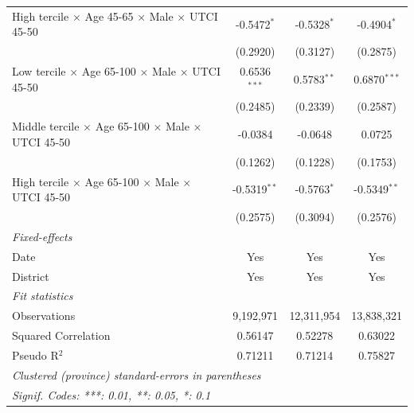 \begin{table}[htbp]
\begin{tabular}{lccc}
      High tercile $\times$ Age 45-65 $\times$ Male $\times$ UTCI 45-50         & -0.5472$^{*}$   & -0.5328$^{*}$     & -0.4904$^{*}$\\   
                                                                                & (0.2920)        & (0.3127)          & (0.2875)\\   
      Low tercile $\times$ Age 65-100 $\times$ Male $\times$ UTCI 45-50         & 0.6536$^{***}$  & 0.5783$^{**}$     & 0.6870$^{***}$\\   
                                                                                & (0.2485)        & (0.2339)          & (0.2587)\\   
      Middle tercile $\times$ Age 65-100 $\times$ Male $\times$ UTCI 45-50      & -0.0384         & -0.0648           & 0.0725\\   
                                                                                & (0.1262)        & (0.1228)          & (0.1753)\\   
      High tercile $\times$ Age 65-100 $\times$ Male $\times$ UTCI 45-50        & -0.5319$^{**}$  & -0.5763$^{*}$     & -0.5349$^{**}$\\   
                                                                                & (0.2575)        & (0.3094)          & (0.2576)\\   
      \midrule
      \emph{Fixed-effects}\\
      Date                                                                      & Yes             & Yes               & Yes\\  
      District                                                                  & Yes             & Yes               & Yes\\  
      \midrule
      \emph{Fit statistics}\\
      Observations                                                              & 9,192,971       & 12,311,954        & 13,838,321\\  
      Squared Correlation                                                       & 0.56147         & 0.52278           & 0.63022\\  
      Pseudo R$^2$                                                              & 0.71211         & 0.71214           & 0.75827\\  
      \midrule \midrule
      \multicolumn{4}{l}{\emph{Clustered (province) standard-errors in parentheses}}\\
      \multicolumn{4}{l}{\emph{Signif. Codes: ***: 0.01, **: 0.05, *: 0.1}}\\
   \end{tabular}
\end{table}


